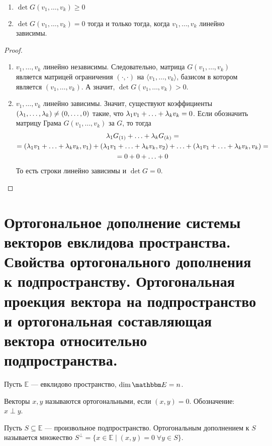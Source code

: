 \begin{Suggestion}\
	\begin{enumerate}
		\item $\det G(v_1, \ldots, v_k) \geqslant 0$
		\item $\det G(v_1, \ldots, v_k) = 0$ тогда и только тогда, когда $v_1, \ldots, v_k$ линейно зависимы.
	\end{enumerate}
\end{Suggestion}

\begin{proof}\
	\begin{enumerate}
		\item $v_1, \ldots, v_k$ линейно независимы. Следовательно, матрица $G(v_1, \ldots, v_k)$ является матрицей ограничения $(\cdot, \cdot)$ на $\langle v_1, \ldots, v_k\rangle$, базисом в котором является $(v_1, \ldots, v_k)$. А значит, $\det G(v_1, \ldots, v_k) > 0$.
		\item $v_1, \ldots, v_k$  линейно зависимы. Значит, существуют коэффициенты $(\lambda_1, \ldots, \lambda_k) \neq (0,  \ldots, 0)$ такие, что $\lambda_1v_1 + \ldots + \lambda_kv_k = 0$. Если обозначить матрицу Грама $G(v_1, \ldots, v_k)$ за $G$, то тогда
		\begin{gather*}
		\lambda_1 G_{(1)} + \ldots + \lambda_kG_{(k)} = \\ =
		(\lambda_1v_1 + \ldots + \lambda_kv_k, v_1) + (\lambda_1v_1 + \ldots + \lambda_kv_k, v_2) + \ldots + (\lambda_1v_1 + \ldots + \lambda_kv_k, v_k) =\\= 0 + 0 + \ldots + 0
		\end{gather*}
		То есть строки линейно зависимы и $\det G = 0$.
	\end{enumerate}
\end{proof}

\section{Ортогональное дополнение системы векторов евклидова пространства. Свойства ортогонального дополнения к подпространству. Ортогональная проекция вектора на подпространство и ортогональная составляющая вектора относительно подпространства.}

Пусть $\mathbb{E}$ --- евклидово пространство, $\dim \E = n$.
\begin{Def}
	Векторы $x,y$ называются ортогональными, если $(x,y)=0$. Обозначение: \\$x\perp y$. 
\end{Def}

\begin{Def}
	Пусть $S \subseteq \mathbb{E}$ --- произвольное подпространство. Ортогональным дополнением к $S$ называется множество $S^{\perp} = \{x\in \mathbb{E}\; |\; (x,y) = 0\;\forall y \in S\}$.
\end{Def}

